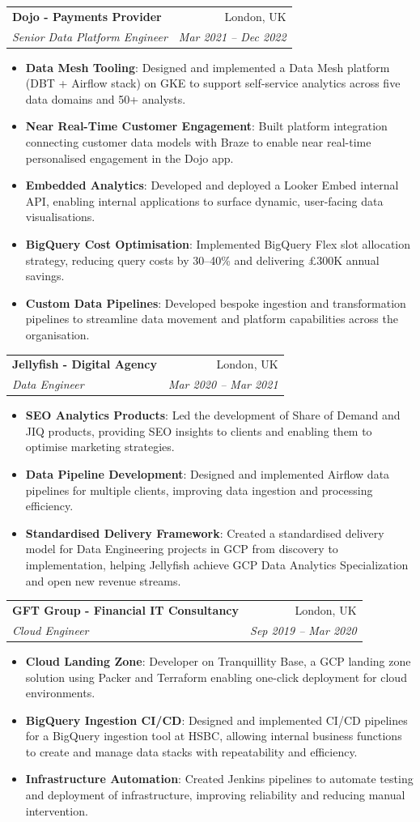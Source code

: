 \documentclass[letterpaper,11pt]{article}
\makeatletter
\newcommand{\resumeItem}[2]{
  \item\small{
    \textbf{#1}{: #2 \vspace{-2pt}}
  }
}
\newcommand{\resumeSubheading}[4]{
  \vspace{-1pt}\item
    \begin{tabular*}{0.97\textwidth}{l@{\extracolsep{\fill}}r}
      \textbf{#1} & #2 \\
      \textit{\small#3} & \textit{\small #4} \\
    \end{tabular*}\vspace{-5pt}
}
\newcommand{\resumeItemListStart}{\begin{itemize}}
\newcommand{\resumeItemListEnd}{\end{itemize}\vspace{-5pt}}
\makeatother
\begin{document}
    \resumeSubheading
      {Dojo \textnormal{- Payments Provider}}{London, UK}
      {Senior Data Platform Engineer}{Mar 2021 -- Dec 2022}
    \resumeItemListStart
      \resumeItem{Data Mesh Tooling}{Designed and implemented a Data Mesh platform (DBT + Airflow stack) on GKE to support self-service analytics across five data domains and 50+ analysts.}
      \resumeItem{Near Real-Time Customer Engagement}{Built platform integration connecting customer data models with Braze to enable near real-time personalised engagement in the Dojo app.}
      \resumeItem{Embedded Analytics}{Developed and deployed a Looker Embed internal API, enabling internal applications to surface dynamic, user-facing data visualisations.}
      \resumeItem{BigQuery Cost Optimisation}{Implemented BigQuery Flex slot allocation strategy, reducing query costs by 30--40\% and delivering \pounds300K annual savings.}
      \resumeItem{Custom Data Pipelines}{Developed bespoke ingestion and transformation pipelines to streamline data movement and platform capabilities across the organisation.}
    \resumeItemListEnd
  
    \resumeSubheading
      {Jellyfish \textnormal{- Digital Agency}}{London, UK}
      {Data Engineer}{Mar 2020 -- Mar 2021}
        \resumeItemListStart
          \resumeItem{SEO Analytics Products}{Led the development of Share of Demand and JIQ products, providing SEO insights to clients and enabling them to optimise marketing strategies.}
          \resumeItem{Data Pipeline Development}{Designed and implemented Airflow data pipelines for multiple clients, improving data ingestion and processing efficiency.}
          \resumeItem{Standardised Delivery Framework}{Created a standardised delivery model for Data Engineering projects in GCP from discovery to implementation, helping Jellyfish achieve GCP Data Analytics Specialization and open new revenue streams.}
        \resumeItemListEnd

    \resumeSubheading
      {GFT Group \textnormal{- Financial IT Consultancy} }{London, UK}
      {Cloud Engineer}{Sep 2019 -- Mar 2020}
        \resumeItemListStart
          \resumeItem{Cloud Landing Zone}{Developer on Tranquillity Base, a GCP landing zone solution using Packer and Terraform enabling one-click deployment for cloud environments.}
          \resumeItem{BigQuery Ingestion CI/CD}{Designed and implemented CI/CD pipelines for a BigQuery ingestion tool at HSBC, allowing internal business functions to create and manage data stacks with repeatability and efficiency.}
          \resumeItem{Infrastructure Automation}{Created Jenkins pipelines to automate testing and deployment of infrastructure, improving reliability and reducing manual intervention.}
        \resumeItemListEnd
\end{document}
